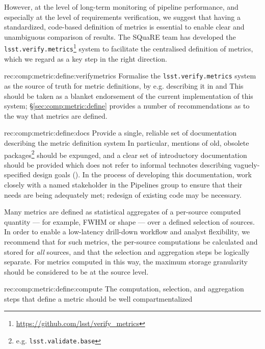 However, at the level of long-term monitoring of pipeline performance, and especially at the level of requirements verification, we suggest that having a standardized, code-based definition of metrics is essential to enable clear and unambiguous comparison of results.
The SQuaRE team has developed the \texttt{lsst.verify.metrics}\footnote{\url{https://github.com/lsst/verify_metrics}} system to facilitate the centralised definition of metrics, which we regard as a key step in the right direction.

\begin{recommendation}
    {rec:comp:metric:define:verifymetrics}
    {Formalise the \texttt{lsst.verify.metrics} system as the source of truth for metric definitions, by e.g. describing it in  and }
    This should be taken as a blanket endorsement of the current implementation of this system; \S\ref{sec:comp:metric:define} provides a number of recommendations as to the way that metrics are defined.
\end{recommendation}

\begin{recommendation}
    {rec:comp:metric:define:docs}
    {Provide a single, reliable set of documentation describing the metric definition system}
    In particular, mentions of old, obsolete packages\footnote{e.g. \texttt{lsst.validate.base}} should be expunged, and a clear set of introductory documentation should be provided which does not refer to informal technotes describing vaguely-specified design goals ().
    In the process of developing this documentation, work closely with a named stakeholder in the Pipelines group to ensure that their needs are being adequately met; redesign of existing code may be necessary.
\end{recommendation}

Many metrics are defined as statistical aggregates of a per-source computed quantity --- for example, FWHM or shape --- over a defined selection of sources.
In order to enable a low-latency drill-down workflow and analyst flexibility, we recommend that for such metrics, the per-source computations be calculated and stored for \emph{all} sources, and that the selection and aggregation steps be logically separate.
For metrics computed in this way, the maximum storage granularity should be considered to be at the source level.

\begin{recommendation}
    {rec:comp:metric:define:compute}
    {The computation, selection, and aggregation steps that define a metric should be well compartmentalized}
\end{recommendation}


